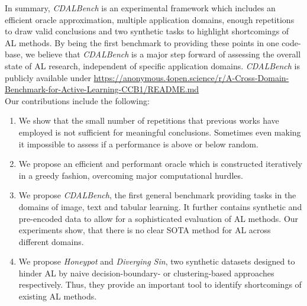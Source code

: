 \documentclass[]{article}
\begin{document}
In summary, \emph{CDALBench} is an experimental framework which includes an
efficient oracle approximation, multiple application domains, enough repetitions to
draw valid conclusions and two synthetic tasks to highlight shortcomings of AL methods. 
By being the first benchmark to providing these points in one code-base, 
we believe that \emph{CDALBench} is a major step forward of assessing the overall state of AL research, independent of
specific application domains. \emph{CDALBench} is publicly available under %
\url{https://anonymous.4open.science/r/A-Cross-Domain-Benchmark-for-Active-Learning-CCB1/README.md}
\\ [1mm]
Our contributions include the following:
%
\begin{enumerate}
\item\label{cont:repetitions} We show that the small number of repetitions that previous works have employed is not
sufficient for meaningful conclusions. Sometimes even making it impossible to assess if a performance is above or below random.
\item\label{cont:oracle} We propose an efficient and performant oracle which is constructed iteratively in a greedy fashion,
overcoming major computational hurdles.
\item\label{cont:domains} We propose \emph{CDALBench}, the first general benchmark providing tasks
in the domains of image, text and tabular learning. It further contains
synthetic and pre-encoded data to allow for a sophisticated evaluation of AL
methods. Our experiments show, that there is no clear SOTA method
for AL across different domains.
\item\label{cont:synthdata} We propose \emph{Honeypot} and \emph{Diverging Sin}, two synthetic datasets
designed to hinder AL by naive decision-boundary- or
clustering-based approaches respectively. Thus, they provide an important tool to identify 
shortcomings of existing AL methods.
\end{enumerate}


\end{document}
